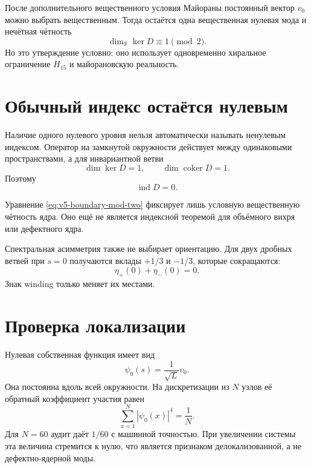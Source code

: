 После дополнительного вещественного условия Майораны постоянный вектор
$v_0$ можно выбрать вещественным. Тогда остаётся одна вещественная нулевая
мода и нечётная чётность
\begin{equation}
 \dim_{\mathbb R}\ker D\equiv1\pmod2.
 \label{eq:v5-boundary-mod-two}
\end{equation}
Но это утверждение условно: оно использует одновременно хиральное
ограничение $H_{15}$ и майорановскую реальность.

\section{Обычный индекс остаётся нулевым}

Наличие одного нулевого уровня нельзя автоматически называть ненулевым
индексом. Оператор на замкнутой окружности действует между одинаковыми
пространствами, а для инвариантной ветви
\begin{equation}
 \dim\ker D=1,
 \qquad
 \dim\operatorname{coker}D=1.
\end{equation}
Поэтому
\begin{equation}
 \operatorname{ind}D=0.
 \label{eq:v5-boundary-index-zero}
\end{equation}

Уравнение \eqref{eq:v5-boundary-mod-two} фиксирует лишь условную
вещественную чётность ядра. Оно ещё не является индексной теоремой для
объёмного вихря или дефектного ядра.

Спектральная асимметрия также не выбирает ориентацию. Для двух дробных
ветвей при $s=0$ получаются вклады $+1/3$ и $-1/3$, которые сокращаются:
\begin{equation}
 \eta_{+}(0)+\eta_{-}(0)=0.
\end{equation}
Знак winding только меняет их местами.

\section{Проверка локализации}

Нулевая собственная функция имеет вид
\begin{equation}
 \psi_0(s)=\frac1{\sqrt L}v_0.
\end{equation}
Она постоянна вдоль всей окружности. На дискретизации из $N$ узлов её
обратный коэффициент участия равен
\begin{equation}
 \sum_{x=1}^{N}|\psi_0(x)|^4=\frac1N.
\end{equation}
Для $N=60$ аудит даёт $1/60$ с машинной точностью. При увеличении системы
эта величина стремится к нулю, что является признаком делокализованной, а
не дефектно-ядерной моды.

